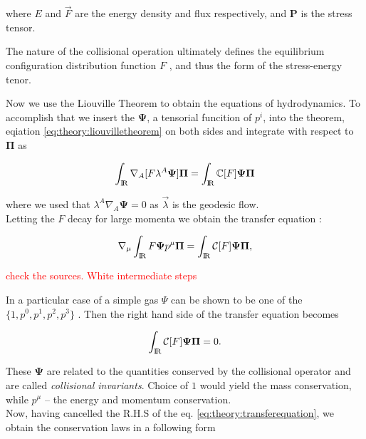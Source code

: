 \documentclass[11pt,a4paper,headinclude=true,DIV=14,BCOR=8mm,chapterprefix,listof=totoc,twoside,openright,abstracton]{scrbook}
\begin{document}
where $E$ and $\vec{F}$ are the energy density and flux respectively, and $\boldsymbol{P}$ is the stress tensor. 

The nature of the collisional operation ultimately defines the equilibrium configuration distribution function $F$ \cite{Cercignani:2002}, and thus the form of the stress-energy tenor. 

Now we use the Liouville Theorem to obtain the equations of hydrodynamics. 
To accomplish that we insert the $\boldsymbol{\Psi}$, a tensorial funcition of $p^i$, into the theorem, eqiation \ref{eq:theory:liouvilletheorem} on both sides and integrate with respect to $\boldsymbol{\Pi}$ as

\begin{equation}
    \int_{\text{I\!R}}\nabla_{A}[F\lambda^A\boldsymbol{\Psi}]\boldsymbol{\Pi}=\int_{\text{I\!R}}\mathbb{C}[F]\boldsymbol{\Psi}\boldsymbol{\Pi}
\end{equation}

where we used that $\lambda^A\nabla_{A}\boldsymbol{\Psi}=0$ as $\vec{\lambda}$ is the geodesic flow. \\

Letting the $F$ decay for large momenta we obtain the transfer equation \cite{Israel:1963,Cercignani:2002}:

\begin{equation}
    \nabla_{\mu}\int_{\text{I\!R}} F\boldsymbol{\Psi}p^{\mu}\boldsymbol{\Pi} =\int_{\text{I\!R}} \mathcal{C}[F]\boldsymbol{\Psi}\boldsymbol{\Pi},
    \label{eq:theory:transferequation}
\end{equation}

\textcolor{red}{check the sources. White intermediate steps}

In a particular case of a simple gas $\Psi$ can be shown to be one of the $\{1,p^0,p^1,p^2,p^3\}$ \cite{Cercignani:2002}. Then the right hand side of the transfer equation becomes 

\begin{equation}
    \int_{\text{I\!R}} \mathcal{C}[F]\boldsymbol{\Psi}\boldsymbol{\Pi} = 0.
\end{equation}

These $\boldsymbol{\Psi}$ are related to the quantities conserved by the collisional operator and are called \textit{collisional invariants}. Choice of $1$ would yield the mass conservation, while $p^{\mu}$ -- the energy and momentum conservation. \\

Now, having cancelled the R.H.S of the eq. \ref{eq:theory:transferequation}, we obtain the conservation laws in a following form
\end{document}
